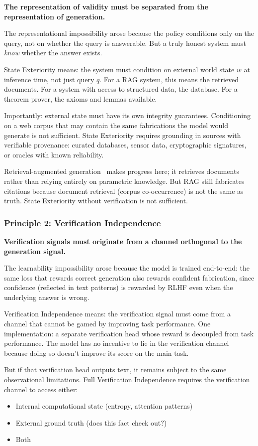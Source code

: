 \documentclass[11pt]{article}
\begin{document}
\textbf{The representation of validity must be separated from the representation of generation.}

The representational impossibility arose because the policy conditions only on the query, not on whether the query is answerable. But a truly honest system must \emph{know} whether the answer exists.

State Exteriority means: the system must condition on external world state $w$ at inference time, not just query $q$. For a RAG system, this means the retrieved documents. For a system with access to structured data, the database. For a theorem prover, the axioms and lemmas available.

Importantly: external state must have its own integrity guarantees. Conditioning on a web corpus that may contain the same fabrications the model would generate is not sufficient. State Exteriority requires grounding in sources with verifiable provenance: curated databases, sensor data, cryptographic signatures, or oracles with known reliability.

Retrieval-augmented generation~\citep{lewis2020retrieval} makes progress here; it retrieves documents rather than relying entirely on parametric knowledge. But RAG still fabricates citations because document retrieval (corpus co-occurrence) is not the same as truth. State Exteriority without verification is not sufficient.

\subsubsection{Principle 2: Verification Independence}

\textbf{Verification signals must originate from a channel orthogonal to the generation signal.}

The learnability impossibility arose because the model is trained end-to-end: the same loss that rewards correct generation also rewards confident fabrication, since confidence (reflected in text patterns) is rewarded by RLHF even when the underlying answer is wrong.

Verification Independence means: the verification signal must come from a channel that cannot be gamed by improving task performance. One implementation: a separate verification head whose reward is decoupled from task performance. The model has no incentive to lie in the verification channel because doing so doesn't improve its score on the main task.

But if that verification head outputs text, it remains subject to the same observational limitations. Full Verification Independence requires the verification channel to access either:
\begin{itemize}
    \item Internal computational state (entropy, attention patterns)
    \item External ground truth (does this fact check out?)
    \item Both
\end{itemize}
\end{document}
